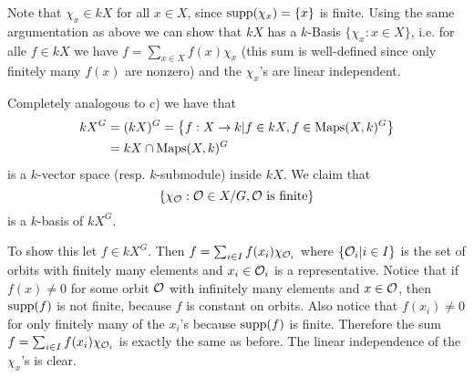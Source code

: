 Note that $\chi_x \in kX$ for all $x \in X$, since $\operatorname{supp}(\chi_x) = \{x\}$ is finite. Using the same argumentation as above we can show that $kX$ has a $k$-Basis $\{\chi_x : x \in X\}$, i.e. for alle $f \in kX$ we have $f = \sum_{x \in X} f(x) \chi_x$ (this sum is well-defined since only finitely many $f(x)$ are nonzero) and the $\chi_x$’s are linear independent.

Completely analogous to c) we have that
\begin{align*}
 kX^G
 &= (kX)^G = \left\{f : X \to k | f \in kX, f \in \operatorname{Maps}(X,k)^G\right\} \\
 &= kX \cap \operatorname{Maps}(X,k)^G
\end{align*}
is a $k$-vector space (resp. $k$-submodule) inside $kX$. We claim that
\[
 \{\chi_\mathcal{O} : \mathcal{O} \in X/G, \mathcal{O} \text{ is finite}\}
\]
is a $k$-basis of $kX^G$.

To show this let $f \in kX^G$. Then $f = \sum_{i \in I} f(x_i) \chi_{\mathcal{O}_i}$ where $\{\mathcal{O}_i | i \in I\}$ is the set of orbits with finitely many elements and $x_i \in \mathcal{O}_i$ is a representative. Notice that if $f(x) \neq 0$ for some orbit $\mathcal{O}$ with infinitely many elements and $x \in \mathcal{O}$, then $\operatorname{supp}(f)$ is not finite, because $f$ is constant on orbits. Also notice that $f(x_i) \neq 0$ for only finitely many of the $x_i$’s because $\operatorname{supp}(f)$ is finite. Therefore the sum $f = \sum_{i \in I} f(x_i) \chi_{\mathcal{O}_i}$ is exactly the same as before. The linear independence of the $\chi_x$’s is clear.


